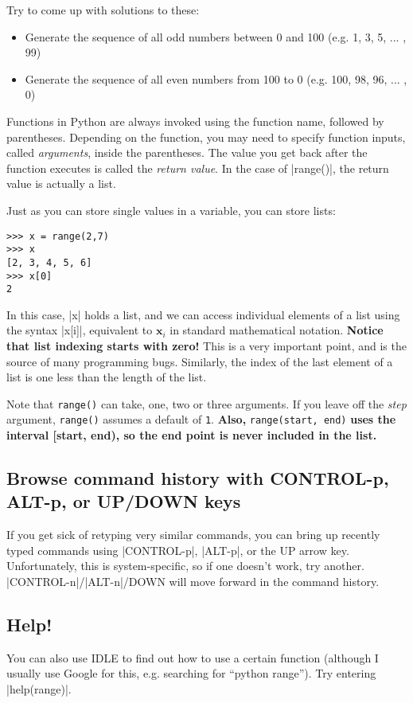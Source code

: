 \documentclass{article}
\begin{document}
Try to come up with solutions to these:
\begin{itemize}
 \item Generate the sequence of all odd numbers between 0 and 100 (e.g. 1, 3, 5,
... , 99)
 \item Generate the sequence of all even numbers from 100 to 0 (e.g. 100, 98,
96, ... , 0)
\end{itemize}

Functions in Python are always invoked using the function name, followed by parentheses.  Depending on the function, you may need to specify
function inputs, called \textit{arguments}, inside the parentheses.  The value you get back after the function executes is
called the \textit{return value}.  In the case of |range()|, the return value is actually a list.

Just as you can store single values in a variable, you can store lists:

\begin{Verbatim}
>>> x = range(2,7)
>>> x
[2, 3, 4, 5, 6]
>>> x[0]
2
\end{Verbatim}

In this case, |x| holds a list, and we can access individual elements of a list
using the syntax |x[i]|, equivalent to $\textbf{x}_{i}$ in standard mathematical
notation.  \textbf{Notice that list indexing starts with zero!}  This is a very
important point, and is the source of many programming bugs.  Similarly, the
index of the last element of a list is one less than the length of the list.

Note that \texttt{range()} can take, one, two or three arguments.  If you leave
off the \textit{step} argument, \texttt{range()} assumes a default of
\texttt{1}.  \textbf{Also,} \texttt{range(start, end)} \textbf{uses the interval
[start, end), so the end point is never included in the list.}

\subsection{Browse command history with CONTROL-p, ALT-p, or UP/DOWN keys}
If you get sick of retyping very similar commands, you can bring up recently
typed commands using |CONTROL-p|, |ALT-p|, or the UP arrow key.  Unfortunately,
this is system-specific, so if one doesn't work, try another.  |CONTROL-n|/|ALT-n|/DOWN will move
forward in the command history.

\subsection{Help!}
You can also use IDLE to find out how to use a certain function (although I
usually use Google for this, e.g. searching for ``python range'').  Try entering
|help(range)|.
\end{document}
